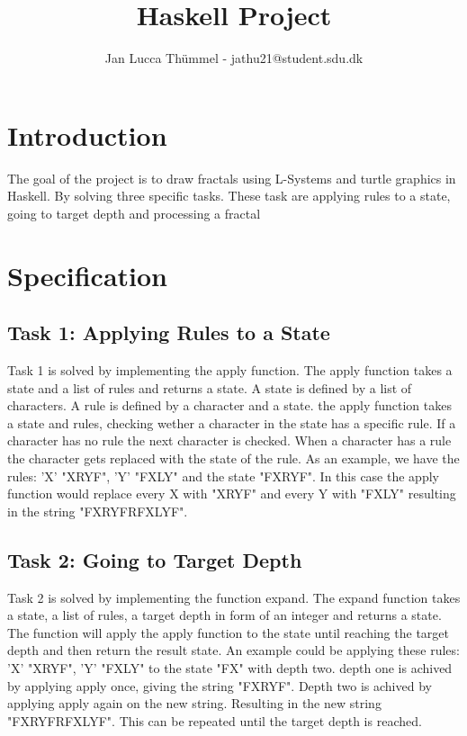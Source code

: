 \documentclass{article}
\title{Haskell Project}
\author{Jan Lucca Thümmel - jathu21@student.sdu.dk}
\begin{document}
\maketitle


\tableofcontents

\newpage

\section{Introduction}
The goal of the project is to draw fractals using L-Systems and turtle graphics in Haskell. By solving three specific tasks. These task are applying rules to a state, going to target depth and processing a fractal

\section{Specification}

\subsection{Task 1: Applying Rules to a State}
Task 1 is solved by implementing the apply function. The apply function takes a state and a list of rules and returns a state. A state is defined by a list of characters. A rule is defined by a character and a state. the apply function takes a state and rules, checking wether a character in the state has a specific rule. If a character has no rule the next character is checked. When a character has a rule the character gets replaced with the state of the rule. As an example, we have the rules: ’X’ "XRYF", ’Y’ "FXLY" and the state "FXRYF". In this case the apply function would replace every X with "XRYF" and every Y with "FXLY" resulting in the string "FXRYFRFXLYF".

\subsection{Task 2: Going to Target Depth}
Task 2 is solved by implementing the function expand. The expand function takes a state, a list of rules, a target depth in form of an integer and returns a state. The function will apply the apply function to the state until reaching the target depth and then return the result state. An example could be applying these rules: ’X’ "XRYF", ’Y’ "FXLY" to the state "FX" with depth two. depth one is achived by applying apply once, giving the string "FXRYF". Depth two is achived by applying apply again on the new string. Resulting in the new string "FXRYFRFXLYF". This can be repeated until the target depth is reached.
\end{document}
